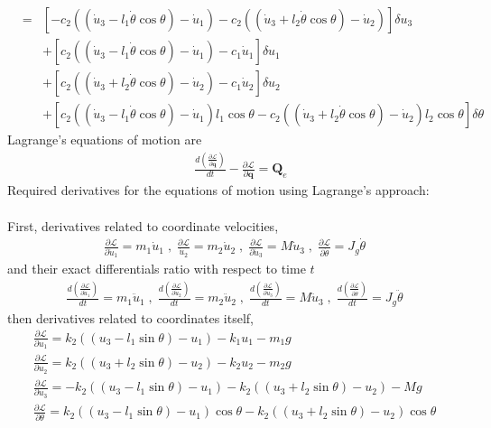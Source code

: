 \documentclass[]{report}
\begin{document}
\begin{eqnarray*}
&=&\left[-c_2 \left(\left(\dot{u}_3-l_1 \dot{\theta}\cos{\theta}\right)-\dot{u}_1\right)-
c_2 \left(\left(\dot{u}_3+l_2 \dot{\theta}\cos{\theta}\right)-\dot{u}_2\right)\right]\delta u_3\\
&&+\left[c_2 \left(\left(\dot{u}_3-l_1 \dot{\theta}\cos{\theta}\right)-\dot{u}_1\right)-c_1 \dot{u}_1\right]\delta u_1\\
&&+\left[c_2 \left(\left(\dot{u}_3+l_2 \dot{\theta}\cos{\theta}\right)-\dot{u}_2\right)-c_1 \dot{u}_2\right]\delta u_2\\
&&+\left[c_2 \left(\left(\dot{u}_3-l_1 \dot{\theta}\cos{\theta}\right)-\dot{u}_1\right)l_1 \cos{\theta}-
c_2 \left(\left(\dot{u}_3+l_2 \dot{\theta}\cos{\theta}\right)-\dot{u}_2\right)l_2 \cos{\theta}\right]\delta \theta
\end{eqnarray*}
Lagrange's equations of motion are
\begin{eqnarray*}
\quad \frac{d \left(\frac{\partial \mathcal{L}}{\partial \dot{\mathbf{q}}}\right)}{dt} -\frac{\partial \mathcal{L}}{\partial \mathbf{q}}=\mathbf{Q}_e
\end{eqnarray*}
Required derivatives for the equations of motion using Lagrange's approach:\\
\\
First, derivatives related to coordinate velocities,
\begin{eqnarray*}
\frac{\partial \mathcal{L}}{\partial \dot{u}_1}=m_1 \dot{u}_1 \;,\; \frac{\partial \mathcal{L}}{\dot{u}_2}=m_2 \dot{u}_2 \;,\; \frac{\partial \mathcal{L}}{\partial \dot{u}_3}=M\dot{u}_3 \;,\;\frac{\partial \mathcal{L}}{\partial \dot{\theta}}=J_g \dot{\theta}
\end{eqnarray*}
and their exact differentials ratio with respect to time $t$
\begin{eqnarray*}
\frac{d\left(\frac{\partial \mathcal{L}}{\partial \dot{u}_1}\right)}{d t}=m_1 \ddot{u}_1 \;,\; \frac{d\left(\frac{\partial \mathcal{L}}{\partial \dot{u}_2}\right)}{d t}=m_2 \ddot{u}_2 \;,\; \frac{d\left(\frac{\partial \mathcal{L}}{\partial \dot{u}_3}\right)}{d t}=M\ddot{u}_3 \;,\;\frac{d\left(\frac{\partial \mathcal{L}}{\partial \dot{\theta}}\right)}{d t}=J_g \ddot{\theta}
\end{eqnarray*}
then derivatives related to coordinates itself,
\begin{eqnarray*}
\frac{\partial \mathcal{L}}{\partial {u}_1}=k_2\left(\left(u_3 -l_1 \sin{\theta}\right)-u_1\right)-k_1u_1-m_1 g \\
\frac{\partial \mathcal{L}}{\partial {u}_2}=k_2\left(\left(u_3 +l_2 \sin{\theta}\right)-u_2\right)-k_2u_2-m_2 g\\
\frac{\partial \mathcal{L}}{\partial {u}_3}=-k_2 \left(\left(u_3 -l_1 \sin{\theta}\right)-u_1\right)-k_2\left(\left(u_3 +l_2 \sin{\theta}\right)-u_2\right)-M g \\
\frac{\partial \mathcal{L}}{\partial \theta}=k_2\left(\left(u_3 -l_1 \sin{\theta}\right)-u_1\right) \cos{\theta}-k_2\left(\left(u_3 +l_2 \sin{\theta}\right)-u_2\right) \cos{\theta}
\end{eqnarray*}
\end{document}
